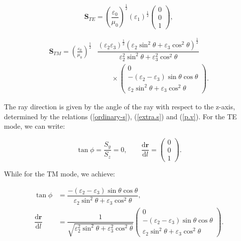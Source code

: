 \documentclass[9pt,twocolumn,twoside]{osajnl}
\begin{document}
 \begin{equation}\label{ordinary-s}
\mathbf{S}_{TE}= \left(\frac{\varepsilon_{0}}{\mu_{0}}\right)^{\frac{1}{2}}(\varepsilon_{1})^{\frac{1}{2}}
 \begin{pmatrix}
 0\\0\\1
 \end{pmatrix},
  \end{equation}
 
  \begin{align}\label{extra.s}
 \mathbf{S}_{TM}= \left(\frac{\varepsilon_{0}}{\mu_{0}}\right)^{\frac{1}{2}} &\dfrac{(\varepsilon_{2}\varepsilon_{3})^{\frac{1}{2}}({\varepsilon_{2}\sin^{2}{\theta}+\varepsilon_{3}\cos^{2}{\theta}})^{\frac{1}{2}}}{\varepsilon_{2}^{2} \sin^{2}{\theta} + \varepsilon_{3}^{2}\cos^{2}{\theta}}\nonumber \\
&\qquad \times\begin{pmatrix}
 0\\ -(\varepsilon_{2}-\varepsilon_{3})\sin{\theta}\cos{\theta}  \\  \varepsilon_{2} \sin^{2}{\theta} + \varepsilon_{3}\cos^{2}{\theta}
 \end{pmatrix}. 
 \end{align}
 
 The ray direction is given by the angle of the ray with respect to the z-axis, determined  by the relations (\ref{ordinary-s}), (\ref{extra.s}) and (\ref{p.v}).
 For the TE mode, we can write:

 \begin{equation}\label{ordinary-d}
\tan{\phi}=\dfrac{S_{y}}{S_{z}}=0, \qquad \dfrac{\mathbf{\mathrm{d}{r}}}{\mathrm{d}{l}}=
 \begin{pmatrix}
 0\\0\\1
 \end{pmatrix}.
\end{equation}

While for the TM mode, we achieve:

\begin{equation}\label{extra.d}\begin{split}
\tan\phi & =\dfrac{-(\varepsilon_{2}-\varepsilon_{3})\sin{\theta}\cos{\theta}}{\varepsilon_{2} \sin^{2}{\theta} + \varepsilon_{3}\cos^{2}{\theta}},\\
 \dfrac{\mathbf{\mathrm{d}{r}}}{\mathrm{d}{l}} & =\dfrac{1}{\sqrt{\varepsilon_{2}^{2} \sin^{2}{\theta} + \varepsilon_{3}^{2}\cos^{2}{\theta}}}
 \begin{pmatrix}
 0\\ -(\varepsilon_{2}-\varepsilon_{3})\sin{\theta}\cos{\theta}  \\  \varepsilon_{2} \sin^{2}{\theta} + \varepsilon_{3}\cos^{2}{\theta}
 \end{pmatrix}.
\end{split}\end{equation}
\end{document}
